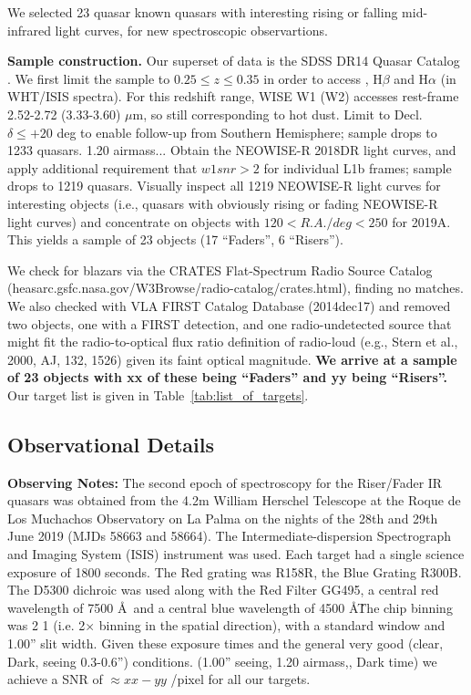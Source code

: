 \documentclass[a4paper,fleqn,usenatbib]{mnras}
\begin{document}
We selected 23 quasar known quasars with interesting 
rising or falling mid-infrared light curves, for new spectroscopic 
observartions. 

{\bf Sample construction.} Our superset of data is the 
SDSS DR14 Quasar Catalog \citep[hereafter, ``DR14Q''; ][]{Paris2018}. 
We first limit the sample to $0.25 \leq z \leq 0.35$ in order to access 
\mgii, H$\beta$ and H$\alpha$ (in WHT/ISIS spectra). For this redshift range,
WISE W1 (W2) accesses rest-frame 2.52-2.72 (3.33-3.60) $\mu$m, so
still corresponding to hot dust.  
Limit to Decl. $\delta \leq +20$
deg to enable follow-up from Southern Hemisphere; sample drops to
1233 quasars.  
 1.20 airmass...
Obtain the NEOWISE-R 2018DR light curves, and apply
additional requirement that $w1snr>2$ for individual L1b frames;
sample drops to 1219 quasars.  Visually inspect all 1219 NEOWISE-R light
curves for interesting objects (i.e., quasars with obviously rising
or fading NEOWISE-R light curves) and concentrate on objects with
$120 < R.A./deg < 250$ for 2019A.  This yields a sample of 23 objects
(17 ``Faders'', 6 ``Risers'').

We check for blazars via the CRATES Flat-Spectrum Radio
Source Catalog (heasarc.gsfc.nasa.gov/W3Browse/radio-catalog/crates.html),
finding no matches.  We also checked with VLA FIRST Catalog Database
(2014dec17) and removed two objects, one with a FIRST detection,
and one radio-undetected source that might fit the
radio-to-optical flux ratio definition of radio-loud (e.g., Stern
et al., 2000, AJ, 132, 1526)  given its faint optical magnitude.
{\bf We arrive at a sample of 23 objects with xx of these being 
``Faders'' and yy  being ``Risers''.}
Our target list is given in Table~\ref{tab:list_of_targets}. 


\subsection{Observational Details}
{\bf Observing Notes:} 
The second epoch of spectroscopy for the Riser/Fader IR quasars was 
obtained from the 
4.2m William Herschel Telescope at the Roque de Los Muchachos Observatory 
on La Palma on the nights of the 28th and 29th June 2019 (MJDs 58663 
and 58664). 
The  Intermediate-dispersion Spectrograph and Imaging System (ISIS) 
instrument was used. 
Each target had a single science exposure of 1800 seconds. 
The Red grating was R158R, the Blue Grating R300B. 
The D5300 dichroic was used along with the Red Filter GG495, 
a central red wavelength of  7500 \AA\ and a central blue wavelength of 4500 \AA\. 
The chip binning was 2 1 (i.e. 2$\times$ binning in the spatial direction), with a standard window and 1.00'' slit width.
Given these exposure times and the general very good 
(clear, Dark, seeing 0.3-0.6'') conditions. 
(1.00'' seeing, 1.20 airmass,, Dark time) we 
achieve a SNR of $\approx xx-yy$ /pixel for all our targets.  
\end{document}

